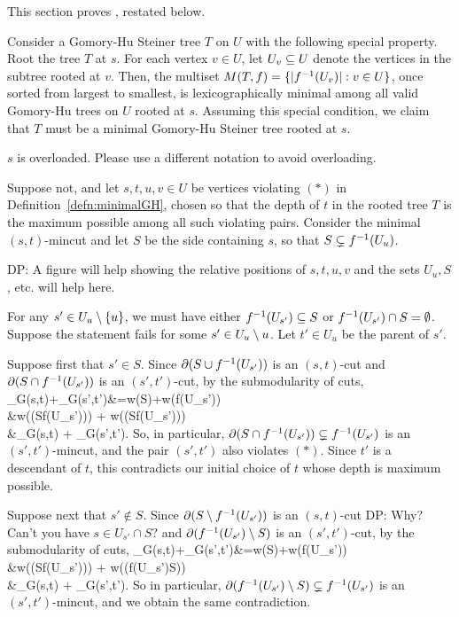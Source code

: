 This section proves , restated below.
\Rooted*

Consider a Gomory-Hu Steiner tree $T$ on $U$ with the following special property. Root the tree $T$ at $s$. For each vertex $v\in U$, let $U_v\subseteq U$ denote the vertices in the subtree rooted at $v$. Then, the multiset $M(T,f)=\{ |f^{-1}(U_v)| : v\in U\}$, once sorted from largest to smallest, is lexicographically minimal among all valid Gomory-Hu trees on $U$ rooted at $s$. Assuming this special condition, we claim that $T$ must be a minimal Gomory-Hu Steiner tree rooted at $s$.

\alert{$s$ is overloaded. Please use a different notation to avoid overloading.}

Suppose not, and let $s,t,u,v\in U$ be vertices violating $(*)$ in Definition~\ref{defn:minimalGH}, chosen so that the depth of $t$ in the rooted tree $T$ is the maximum possible among all such violating pairs. Consider the minimal $(s,t)$-mincut and let $S$ be the side containing $s$, so that $S\subsetneq f^{-1}(U_u)$.

\alert{DP: A figure will help showing the relative positions of $s, t, u, v$ and the sets $U_u, S$, etc. will help here.}

\BCL{}
For any $s'\in U_u\setminus \{u\}$, we must have either $f^{-1}(U_{s'})\subseteq S$ or $f^{-1}(U_{s'})\cap S=\emptyset$.
\ECL
\BP
Suppose the statement fails for some $s'\in U_u\setminus u$. Let $t'\in U_u$ be the parent of $s'$.

Suppose first that $s'\in S$. Since $\partial(S\cup f^{-1}(U_{s'}))$ is an $(s,t)$-cut and $\partial(S\cap f^{-1}(U_{s'}))$ is an $(s',t')$-cut, by the submodularity of cuts,
\BAL
\mincut_G(s,t)+\mincut_G(s',t')&=w(\pt S)+w(\pt f\inv(U_{s'})) 
\\&\ge w(\pt(S\cup f\inv(U_{s'}))) + w(\pt(S\cap f\inv(U_{s'}))) 
\\&\ge \mincut_G(s,t) + \mincut_G(s',t').
\EAL
So, in particular, $\partial(S\cap f^{-1}(U_{s'})) \subsetneq f^{-1}(U_{s'})$ is an $(s',t')$-mincut, and the pair $(s',t')$ also violates $(*)$. Since $t'$ is a descendant of $t$, this contradicts our initial choice of $t$ whose depth is maximum possible. 

Suppose next that $s'\notin S$. Since $\partial(S\setminus f^{-1}(U_{s'}))$ is an $(s,t)$-cut \alert{DP: Why? Can't you have $s\in U_{s'}\cap S$?} and $\partial(f^{-1}(U_{s'})\setminus S)$ is an $(s',t')$-cut, by the submodularity of cuts,
\BAL
\mincut_G(s,t)+\mincut_G(s',t')&=w(\pt S)+w(\pt f\inv(U_{s'})) 
\\&\ge w(\pt(S\sm f\inv(U_{s'}))) + w(\pt(f\inv(U_{s'})\sm S)) 
\\&\ge \mincut_G(s,t) + \mincut_G(s',t').
\EAL
So in particular, $\partial(f^{-1}(U_{s'})\setminus S)\subsetneq f^{-1}(U_{s'})$ is an $(s',t')$-mincut, and we obtain the same contradiction. 
\EP


